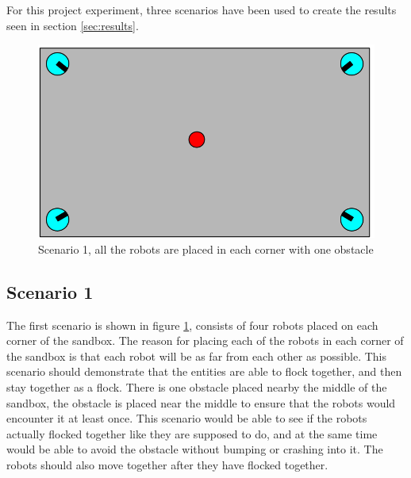 For this project experiment, three scenarios have been used to create the results seen in section \ref{sec:results}.
\label{sec:scenario}
\begin{figure}[h]
\begin{center}
\includegraphics[width=0.8\linewidth]{figs/scenario0}
\end{center}
\caption[scenario 1]{Scenario 1, all the robots are placed in each corner with one obstacle}
\label{fig:scenario1}
\end{figure}

\subsection{Scenario 1}
The first scenario is shown in figure \ref{fig:scenario1}, consists of four robots placed on each corner of the sandbox. The reason for placing each of the robots in each corner of the sandbox is that each robot will be as far from each other as possible. This scenario should demonstrate that the entities are able to flock together, and then stay together as a flock. There is one obstacle placed nearby the middle of the sandbox, the obstacle is placed near the middle to ensure that the robots would encounter it at least once. This scenario would be able to see if the robots actually flocked together like they are supposed to do, and at the same time would be able to avoid the obstacle without bumping or crashing into it. The robots should also move together after they have flocked together.

